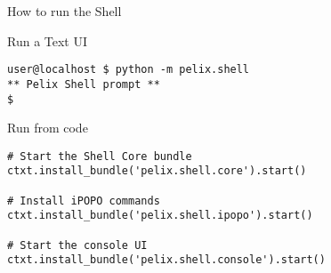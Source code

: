 \begin{frame}[fragile]{How to run the Shell}
\begin{block}{Run a Text UI}
\begin{verbatim}
user@localhost $ python -m pelix.shell
** Pelix Shell prompt **
$
\end{verbatim}
\end{block}

\begin{block}{Run from code}
\begin{verbatim}
# Start the Shell Core bundle
ctxt.install_bundle('pelix.shell.core').start()

# Install iPOPO commands
ctxt.install_bundle('pelix.shell.ipopo').start()

# Start the console UI
ctxt.install_bundle('pelix.shell.console').start()
\end{verbatim}
\end{block}
\end{frame}

